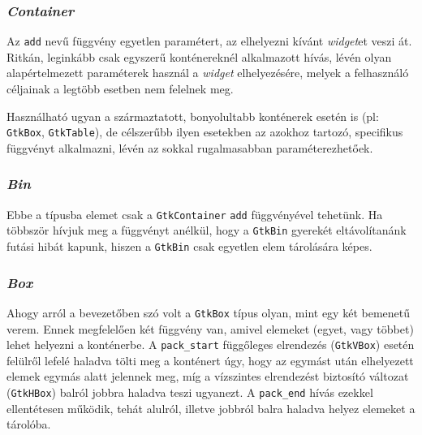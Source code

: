 \subsubsection{\textit{Container}}

Az \texttt{add} nevű függvény egyetlen paramétert, az elhelyezni kívánt \textit{widget}et veszi át. Ritkán, leginkább csak egyszerű konténereknél alkalmazott hívás, lévén olyan alapértelmezett paraméterek használ a \textit{widget} elhelyezésére, melyek a felhasználó céljainak a legtöbb esetben nem felelnek meg.

Használható ugyan a származtatott, bonyolultabb konténerek esetén is (pl: \texttt{GtkBox}, \texttt{GtkTable}), de célszerűbb ilyen esetekben az azokhoz tartozó, specifikus függvényt alkalmazni, lévén az sokkal rugalmasabban paraméterezhetőek.

\subsubsection{\textit{Bin}}

Ebbe a típusba elemet csak a \texttt{GtkContainer} \texttt{add} függvényével tehetünk. Ha többször hívjuk meg a függvényt anélkül, hogy a \texttt{GtkBin} gyerekét eltávolítanánk futási hibát kapunk, hiszen a \texttt{GtkBin} csak egyetlen elem tárolására képes.

\subsubsection{\textit{Box}}

Ahogy arról a bevezetőben szó volt a \texttt{GtkBox} típus olyan, mint egy két bemenetű verem. Ennek megfelelően két függvény van, amivel elemeket (egyet, vagy többet) lehet helyezni a konténerbe. A \texttt{pack\_start} függőleges elrendezés (\texttt{GtkVBox}) esetén felülről lefelé haladva tölti meg a konténert úgy, hogy az egymást után elhelyezett elemek egymás alatt jelennek meg, míg a vízszintes elrendezést biztosító változat (\texttt{GtkHBox}) balról jobbra haladva teszi ugyanezt. A \texttt{pack\_end} hívás ezekkel ellentétesen működik, tehát alulról, illetve jobbról balra haladva helyez elemeket a tárolóba.

